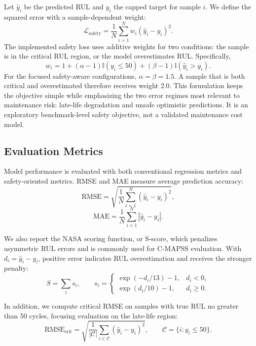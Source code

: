 \documentclass[11pt,a4paper]{article}
\begin{document}
Let $\hat{y}_i$ be the predicted RUL and $y_i$ the capped target for sample $i$. We define the squared error with a sample-dependent weight:
\begin{equation}
\mathcal{L}_{\mathrm{safety}}
=
\frac{1}{N}\sum_{i=1}^{N}
w_i(\hat{y}_i-y_i)^2 .
\end{equation}
The implemented safety loss uses additive weights for two conditions: the sample is in the critical RUL region, or the model overestimates RUL. Specifically,
\begin{equation}
w_i =
1
+(\alpha-1)\mathbb{I}(y_i \leq 50)
+(\beta-1)\mathbb{I}(\hat{y}_i > y_i).
\end{equation}
For the focused safety-aware configurations, \(\alpha=\beta=1.5\). A sample that is both critical and overestimated therefore receives weight 2.0. This formulation keeps the objective simple while emphasizing the two error regimes most relevant to maintenance risk: late-life degradation and unsafe optimistic predictions. It is an exploratory benchmark-level safety objective, not a validated maintenance cost model.

\subsection{Evaluation Metrics}

Model performance is evaluated with both conventional regression metrics and safety-oriented metrics. RMSE and MAE measure average prediction accuracy:
\begin{equation}
\mathrm{RMSE}
=
\sqrt{
\frac{1}{N}
\sum_{i=1}^{N}
(\hat{y}_i-y_i)^2
},
\end{equation}
\begin{equation}
\mathrm{MAE}
=
\frac{1}{N}
\sum_{i=1}^{N}
|\hat{y}_i-y_i|.
\end{equation}

We also report the NASA scoring function, or S-score, which penalizes asymmetric RUL errors and is commonly used for C-MAPSS evaluation. With \(d_i=\hat{y}_i-y_i\), positive error indicates RUL overestimation and receives the stronger penalty:
\begin{equation}
S = \sum_i s_i,\qquad
s_i =
\begin{cases}
\exp(-d_i/13)-1, & d_i < 0,\\
\exp(d_i/10)-1, & d_i \geq 0.
\end{cases}
\end{equation}

In addition, we compute critical RMSE on samples with true RUL no greater than 50 cycles, focusing evaluation on the late-life region:
\begin{equation}
\mathrm{RMSE}_{\mathrm{crit}}
=
\sqrt{
\frac{1}{|\mathcal{C}|}
\sum_{i \in \mathcal{C}}
(\hat{y}_i-y_i)^2
},
\qquad
\mathcal{C}=\{i:y_i \leq 50\}.
\end{equation}
\end{document}
